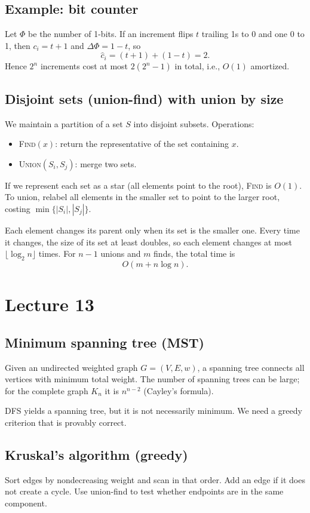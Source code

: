 \documentclass[11pt]{article}
\begin{document}
{{{{\subsection*{Example: bit counter}
Let $\Phi$ be the number of 1-bits. If an increment flips $t$ trailing 1s to 0 and one 0 to 1,
then $c_i = t+1$ and $\Delta \Phi = 1 - t$, so
\[
\hat{c}_i = (t+1) + (1 - t) = 2.
\]
Hence $2^n$ increments cost at most $2(2^n-1)$ in total, i.e., $O(1)$ amortized.

\subsection*{Disjoint sets (union-find) with union by size}
We maintain a partition of a set $S$ into disjoint subsets. Operations:
\begin{itemize}
\item \textsc{Find}$(x)$: return the representative of the set containing $x$.
\item \textsc{Union}$(S_i, S_j)$: merge two sets.
\end{itemize}

If we represent each set as a star (all elements point to the root), \textsc{Find} is $O(1)$.
To union, relabel all elements in the smaller set to point to the larger root, costing
$\min\{|S_i|, |S_j|\}$.

Each element changes its parent only when its set is the smaller one. Every time it changes, the
size of its set at least doubles, so each element changes at most $\lfloor \log_2 n \rfloor$ times.
For $n-1$ unions and $m$ finds, the total time is
\[
O(m + n \log n).
\]

\section{Lecture 13}

\subsection*{Minimum spanning tree (MST)}
Given an undirected weighted graph $G=(V,E,w)$, a spanning tree connects all vertices with
minimum total weight. The number of spanning trees can be large; for the complete graph $K_n$ it is
$n^{n-2}$ (Cayley's formula).

DFS yields a spanning tree, but it is not necessarily minimum. We need a greedy criterion that is
provably correct.

\subsection*{Kruskal's algorithm (greedy)}
Sort edges by nondecreasing weight and scan in that order. Add an edge if it does not create a
cycle. Use union-find to test whether endpoints are in the same component.

}}}}
\end{document}
